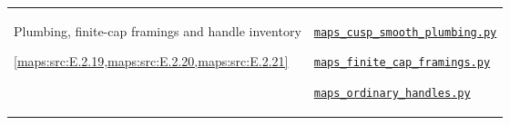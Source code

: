 \begin{longtable}{@{}p{}p{}@{}}
\hypertarget{prog:V:framings}{}Plumbing, finite-cap framings and handle inventory\par \cref{maps:src:E.2.19,maps:src:E.2.20,maps:src:E.2.21} &
\href{https://github.com/KokunoYumeto/s6-complex-structure-workbench/blob/\SsixRepositoryCommit/pro_returns/S6_10_PAPERS_checkpoint_15_20261119T1045Z/S6_10_PAPERS/code/III/maps_cusp_smooth_plumbing.py}{\nolinkurl{maps_cusp_smooth_plumbing.py}}\par \href{https://github.com/KokunoYumeto/s6-complex-structure-workbench/blob/\SsixRepositoryCommit/pro_returns/S6_10_PAPERS_checkpoint_15_20261119T1045Z/S6_10_PAPERS/code/III/maps_finite_cap_framings.py}{\nolinkurl{maps_finite_cap_framings.py}}\par \href{https://github.com/KokunoYumeto/s6-complex-structure-workbench/blob/\SsixRepositoryCommit/pro_returns/S6_10_PAPERS_checkpoint_15_20261119T1045Z/S6_10_PAPERS/code/V/replay_chains/code/maps_ordinary_handles.py}{\nolinkurl{maps_ordinary_handles.py}} \\[3pt]
\end{longtable}
\endgroup
